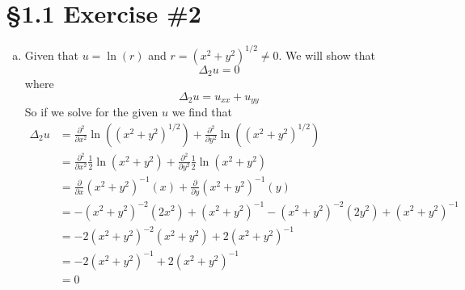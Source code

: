 \documentclass[11pt]{article}
\numberwithin{equation}{section}
\begin{document}
\section{\S 1.1 Exercise \#2}
\begin{enumerate}[(a)]
\item
Given that $u = \ln(r)$ and $r = (x^2+y^2)^{1/2}\ne 0$. We will show that 
$$\Delta_2 u = 0$$
where 
$$\Delta_2 u = u_{xx}+u_{yy}$$
So if we solve for the given $u$ we find that
\begin{align*}
\Delta_2 u &= \frac{\partial^2}{\partial x^2}\ln\left((x^2+y^2)^{1/2}\right) + \frac{\partial^2}{\partial y^2}\ln\left((x^2+y^2)^{1/2}\right)\\
&= \frac{\partial^2}{\partial x^2}\frac{1}{2}\ln\left(x^2+y^2\right) + \frac{\partial^2}{\partial y^2}\frac{1}{2}\ln\left(x^2+y^2\right)\\
&= \frac{\partial}{\partial x}(x^2+y^2)^{-1}(x) + \frac{\partial}{\partial y}(x^2+y^2)^{-1}(y)\\
&= -(x^2+y^2)^{-2}(2x^2) + (x^2+y^2)^{-1} - (x^2+y^2)^{-2}(2y^2) + (x^2+y^2)^{-1}\\
&= -2(x^2+y^2)^{-2}\left(x^2+y^2\right)+ 2(x^2+y^2)^{-1}\\
&= -2(x^2+y^2)^{-1} + 2(x^2+y^2)^{-1}\\
&= 0
\end{align*}


\end{enumerate}
\end{document}

